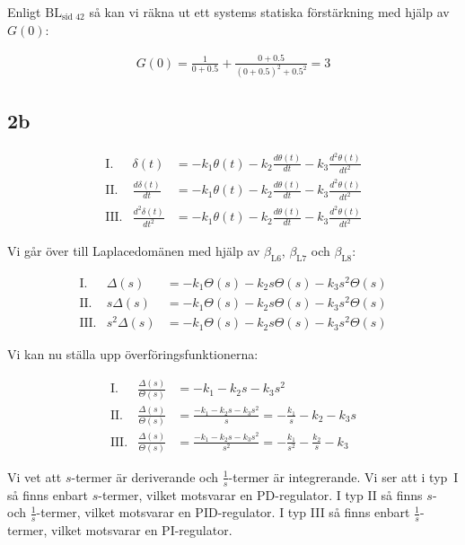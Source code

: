 \documentclass[a4paper]{article}
\newcommand{\mhb}[1]{$\beta_{\text{#1}}$}     %
\newcommand{\bl}[1]{$\text{BL}_{\text{#1}}$}  %
\begin{document}
Enligt \bl{sid 42} så kan vi räkna ut ett systems statiska förstärkning med hjälp av $G(0)$:

\begin{align*}
  G(0) = \frac{1}{0+0.5} + \frac{0+0.5}{(0+0.5)^2 + 0.5^2} = 3
\end{align*}

%
%


\subsection{2b}
\begin{eqnarray*}
  \text{I.}   & \delta(t)                 &= -k_1 \theta(t) - k_2\frac{d\theta(t)}{dt} - k_3\frac{d^2\theta(t)}{dt^2}\\
  \text{II.}  & \frac{d\delta(t)}{dt}     &= -k_1 \theta(t) - k_2\frac{d\theta(t)}{dt} - k_3\frac{d^2\theta(t)}{dt^2}\\
  \text{III.} & \frac{d^2\delta(t)}{dt^2} &= -k_1 \theta(t) - k_2\frac{d\theta(t)}{dt} - k_3\frac{d^2\theta(t)}{dt^2}
\end{eqnarray*}

Vi går över till Laplacedomänen med hjälp av \mhb{L6}, \mhb{L7} och \mhb{L8}:

\begin{eqnarray*}
  \text{I.}   & \Delta(s)    &= -k_1 \Theta(s) - k_2 s\Theta(s) - k_3 s^2\Theta(s)\\
  \text{II.}  & s\Delta(s)   &= -k_1 \Theta(s) - k_2 s\Theta(s) - k_3 s^2\Theta(s)\\
  \text{III.} & s^2\Delta(s) &= -k_1 \Theta(s) - k_2 s\Theta(s) - k_3 s^2\Theta(s)
\end{eqnarray*}

Vi kan nu ställa upp överföringsfunktionerna:

\begin{eqnarray*}
  \text{I.}   & \frac{\Delta(s)}{\Theta(s)} &= -k_1 - k_2 s - k_3 s^2\\
  \text{II.}  & \frac{\Delta(s)}{\Theta(s)} &= \frac{-k_1 - k_2 s - k_3 s^2}{s} = -\frac{k_1}{s} - k_2 - k_3s\\
  \text{III.} & \frac{\Delta(s)}{\Theta(s)} &= \frac{-k_1 - k_2 s - k_3 s^2}{s^2} = -\frac{k_1}{s^2} - \frac{k_2}{s} - k_3
\end{eqnarray*}

Vi vet att $s$-termer är deriverande och $\frac{1}{s}$-termer är integrerande. Vi ser att i \mbox{typ I} så finns enbart $s$-termer, vilket motsvarar en PD-regulator. I typ II så finns $s$- och $\frac{1}{s}$-termer, vilket motsvarar en PID-regulator. I typ III så finns enbart $\frac{1}{s}$-termer, vilket motsvarar en PI-regulator.
\end{document}
